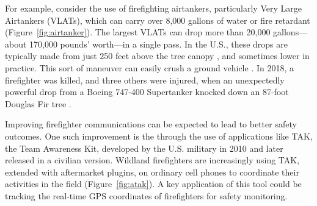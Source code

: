 \documentclass[]             %
{NASA}                       %
\theoremstyle{definition}
\begin{document}
For example, consider the use of firefighting airtankers, particularly
Very Large Airtankers (VLATs), which can carry over 8,000 gallons of
water or fire retardant \cite{2019:airtankerops}
(Figure~\ref{fig:airtanker}). The largest VLATs can drop more than
20,000 gallons---about 170,000 pounds' worth---in a single pass. In
the U.S., these drops are typically made from just 250 feet above the
tree canopy \cite{2019:airtankerops}, and sometimes lower in
practice. This sort of maneuver can easily crush a ground vehicle
\cite{2019:stickney}. In 2018, a firefighter was killed, and three
others were injured, when an unexpectedly powerful drop from a Boeing
747-400 Supertanker knocked down an 87-foot Douglas Fir tree
\cite{2018:calfire}.

Improving firefighter communications can be expected to lead to better
safety outcomes. One such improvement is the through the use of
applications like TAK, the Team Awareness Kit, developed by the
U.S. military in 2010 and later released in a civilian
version. Wildland firefighters are increasingly using TAK, extended
with aftermarket plugins, on ordinary cell phones to coordinate their
activities in the field (Figure~\ref{fig:atak}). A key application of
this tool could be tracking the real-time GPS coordinates of
firefighters for safety monitoring.
\end{document}
